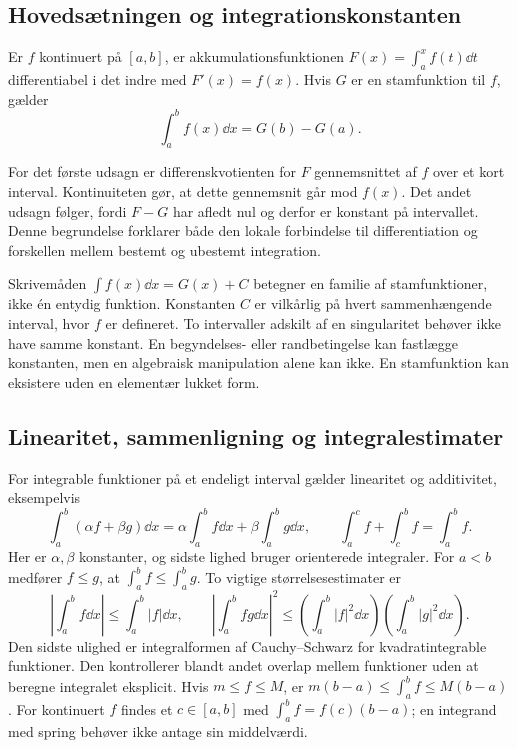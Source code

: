

\begin{samepage}
\subsection{Hovedsætningen og integrationskonstanten}
\begin{saetning}
Er $f$ kontinuert på $[a,b]$, er akkumulationsfunktionen
$F(x)=\int_a^x f(t)\dd t$ differentiabel i det indre med $F'(x)=f(x)$.
Hvis $G$ er en stamfunktion til $f$, gælder
\[
 \int_a^b f(x)\dd x=G(b)-G(a).
\]
\end{saetning}
\end{samepage}
For det første udsagn er differenskvotienten for $F$ gennemsnittet af $f$
over et kort interval. Kontinuiteten gør, at dette gennemsnit går mod
$f(x)$. Det andet udsagn følger, fordi $F-G$ har afledt nul og derfor er
konstant på intervallet. Denne begrundelse forklarer både den lokale
forbindelse til differentiation og forskellen mellem bestemt og ubestemt
integration.

Skrivemåden $\int f(x)\dd x=G(x)+C$ betegner en familie af stamfunktioner,
ikke én entydig funktion. Konstanten $C$ er vilkårlig på hvert sammenhængende
interval, hvor $f$ er defineret. To intervaller adskilt af en singularitet
behøver ikke have samme konstant. En begyndelses- eller randbetingelse kan
fastlægge konstanten, men en algebraisk manipulation alene kan ikke.
En stamfunktion kan eksistere uden en elementær lukket form.

\subsection{Linearitet, sammenligning og integralestimater}
For integrable funktioner på et endeligt interval gælder linearitet og
additivitet, eksempelvis
\[
 \int_a^b(\alpha f+\beta g)\dd x
 =\alpha\int_a^b f\dd x+\beta\int_a^b g\dd x,\qquad
 \int_a^c f+\int_c^b f=\int_a^b f.
\]
Her er $\alpha,\beta$ konstanter, og sidste lighed bruger orienterede
integraler. For $a<b$ medfører $f\le g$, at $\int_a^b f\le\int_a^b g$.
To vigtige størrelsesestimater er
\[
 \left|\int_a^b f\dd x\right|\le\int_a^b|f|\dd x,
 \qquad
 \left|\int_a^b fg\dd x\right|^2
 \le\left(\int_a^b|f|^2\dd x\right)
       \left(\int_a^b|g|^2\dd x\right).
\]
Den sidste ulighed er integralformen af Cauchy--Schwarz for kvadratintegrable
funktioner. Den kontrollerer blandt andet overlap mellem funktioner uden
at beregne integralet eksplicit. Hvis $m\le f\le M$, er
$m(b-a)\le\int_a^b f\le M(b-a)$. For kontinuert $f$ findes et
$c\in[a,b]$ med $\int_a^b f=f(c)(b-a)$; en integrand med spring behøver
ikke antage sin middelværdi.

